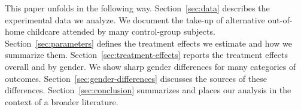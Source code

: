 This paper unfolds in the following way. Section~\ref{sec:data} describes the experimental data we analyze. We document the take-up of  alternative out-of-home childcare attended by many control-group subjects. Section~\ref{sec:parameters} defines the treatment effects we estimate and how we summarize them. Section~\ref{sec:treatment-effects} reports the treatment effects overall and by gender. We show sharp gender differences for many categories of outcomes. Section~\ref{sec:gender-differences} discusses the sources of these differences. Section~\ref{sec:conclusion} summarizes and places our analysis in the context of a  broader literature.
